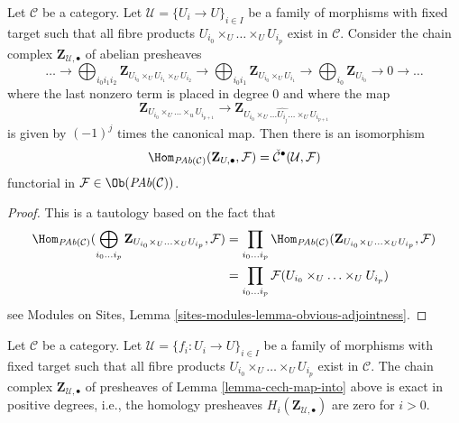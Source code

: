 \begin{lemma}
\label{lemma-cech-map-into}
Let $\mathcal{C}$ be a category. Let $\mathcal{U} = \{U_i \to U\}_{i \in I}$
be a family of morphisms with fixed target such that all fibre products
$U_{i_0} \times_U \ldots \times_U U_{i_p}$ exist in $\mathcal{C}$.
Consider the chain complex $\mathbf{Z}_{\mathcal{U}, \bullet}$
of abelian presheaves
$$
\ldots
\to
\bigoplus_{i_0i_1i_2} \mathbf{Z}_{U_{i_0} \times_U U_{i_1} \times_U U_{i_2}}
\to
\bigoplus_{i_0i_1} \mathbf{Z}_{U_{i_0} \times_U U_{i_1}}
\to
\bigoplus_{i_0} \mathbf{Z}_{U_{i_0}}
\to 0 \to \ldots
$$
where the last nonzero term is placed in degree $0$
and where the map
$$
\mathbf{Z}_{U_{i_0} \times_U \ldots \times_u U_{i_{p + 1}}}
\longrightarrow
\mathbf{Z}_{U_{i_0} \times_U
\ldots \widehat{U_{i_j}} \ldots \times_U U_{i_{p + 1}}}
$$
is given by $(-1)^j$ times the canonical map.
Then there is an isomorphism
$$
\Hom_{\textit{PAb}(\mathcal{C})}(\mathbf{Z}_{{U}, \bullet}, \mathcal{F})
=
\check{\mathcal{C}}^\bullet(\mathcal{U}, \mathcal{F})
$$
functorial in $\mathcal{F} \in \Ob(\textit{PAb}(\mathcal{C}))$.
\end{lemma}

\begin{proof}
This is a tautology based on the fact that
\begin{align*}
\Hom_{\textit{PAb}(\mathcal{C})}(
\bigoplus_{i_0 \ldots i_p}
\mathbf{Z}_{U_{i_0} \times_U \ldots \times_U U_{i_p}},
\mathcal{F})
& =
\prod_{i_0 \ldots i_p}
\Hom_{\textit{PAb}(\mathcal{C})}(
\mathbf{Z}_{U_{i_0} \times_U \ldots \times_U U_{i_p}},
\mathcal{F}) \\
& =
\prod_{i_0 \ldots i_p}
\mathcal{F}(U_{i_0} \times_U \ldots \times_U U_{i_p})
\end{align*}
see Modules on Sites, Lemma \ref{sites-modules-lemma-obvious-adjointness}.
\end{proof}

\begin{lemma}
\label{lemma-homology-complex}
Let $\mathcal{C}$ be a category. Let
$\mathcal{U} = \{f_i : U_i \to U\}_{i \in I}$ be a family of morphisms
with fixed target such that all fibre products
$U_{i_0} \times_U \ldots \times_U U_{i_p}$ exist in $\mathcal{C}$.
The chain complex $\mathbf{Z}_{\mathcal{U}, \bullet}$ of presheaves
of Lemma \ref{lemma-cech-map-into} above is exact in positive
degrees, i.e., the homology presheaves
$H_i(\mathbf{Z}_{\mathcal{U}, \bullet})$ are zero for $i > 0$.
\end{lemma}


